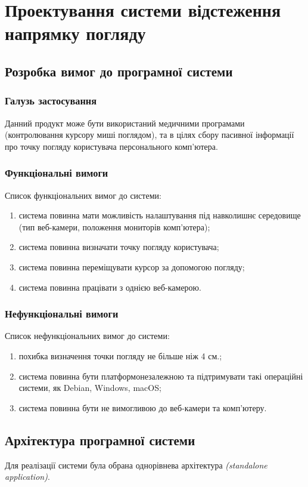 \section{Проектування системи відстеження напрямку погляду}
\subsection{Розробка вимог до програмної системи}
\subsubsection{Галузь застосування}
Данний продукт може бути використаний медичними програмами (контролювання курсору миші поглядом), та в цілях сбору пасивної інформації про точку погляду користувача персонального комп'ютера.

\subsubsection{Функціональні вимоги}
Список функціональних вимог до системи:
\begin{enumerate}[label={\arabic*)}]
	\item система повинна мати можливість налаштування під навколишнє середовище (тип веб-камери, положення мониторів комп'ютера);
	\item система повинна визначати точку погляду користувача;
	\item система повинна переміщувати курсор за допомогою погляду;
	\item система повинна працівати з однією веб-камерою.  
\end{enumerate}

\subsubsection{Нефункціональні вимоги}
Список нефункціональних вимог до системи:
\begin{enumerate}[label={\arabic*)}]
	\item похибка визначення точки погляду не більше ніж 4 см.;
	\item система повинна бути платформонезалежною та підтримувати такі операційні системи, як Debian, Windows, macOS;
	\item система повинна бути не вимогливою до веб-камери та комп'ютеру.
\end{enumerate}

\subsection{Архітектура програмної системи}
Для реалізації системи була обрана однорівнева архітектура \textit{(standalone application)}.

